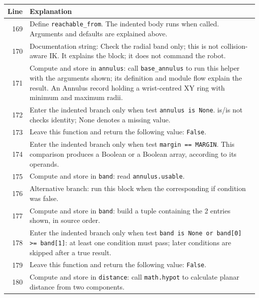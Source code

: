 \documentclass[11pt,a4paper]{book}
\begin{document}
\begin{longtable}{r p{}}

\textbf{Line} & \textbf{Explanation} \\ \hline \endhead

169 & Define \texttt{reachable\_from}. The indented body runs when called. Arguments and defaults are explained above. \\

170 & Documentation string: Check the radial band only; this is not collision-aware IK. It explains the block; it does not command the robot. \\

171 & Compute and store in \texttt{annulus}: call \texttt{base\_annulus} to run this helper with the arguments shown; its definition and module flow explain the result. An Annulus record holding a wrist-centred XY ring with minimum and maximum radii. \\

172 & Enter the indented branch only when test \texttt{annulus is None}. is/is not checks identity; None denotes a missing value. \\

173 & Leave this function and return the following value: \texttt{False}. \\

174 & Enter the indented branch only when test \texttt{margin == MARGIN}. This comparison produces a Boolean or a Boolean array, according to its operands. \\

175 & Compute and store in \texttt{band}: read \texttt{annulus.usable}.  \\

176 & Alternative branch: run this block when the corresponding if condition was false. \\

177 & Compute and store in \texttt{band}: build a tuple containing the 2 entries shown, in source order.  \\

178 & Enter the indented branch only when test \texttt{band is None or band[0] >= band[1]}: at least one condition must pass; later conditions are skipped after a true result. \\

179 & Leave this function and return the following value: \texttt{False}. \\

180 & Compute and store in \texttt{distance}: call \texttt{math.hypot} to calculate planar distance from two components.  \\


\end{longtable}
\end{document}
